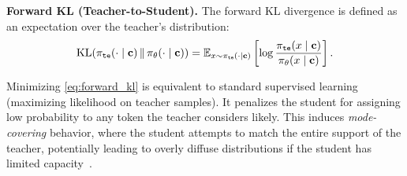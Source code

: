 


\textbf{Forward KL (Teacher-to-Student).}
The forward KL divergence is defined as an expectation over the teacher's distribution:
\begin{equation}
\label{eq:forward_kl}
\mathrm{KL}
(\pi_{\tt{te}}(\cdot\mid\mathbf{c}) \,\|\, \pi_{\theta}(\cdot\mid\mathbf{c})) = \mathbb{E}_{x \sim \pi_{\tt{te}}(\cdot \mid \mathbf{c})} \left[ \log \frac{\pi_{\tt{te}}(x \mid \mathbf{c})}{\pi_\theta(x \mid \mathbf{c})} \right].
\end{equation}

Minimizing \eqref{eq:forward_kl} is equivalent to standard supervised learning (maximizing likelihood on teacher samples). 
It penalizes the student for assigning low probability to any token the teacher considers likely. 
This induces \emph{mode-covering} behavior, where the student attempts to match the entire support of the teacher, potentially leading to overly diffuse distributions if the student has limited capacity~\cite{minka2005divergence}.


